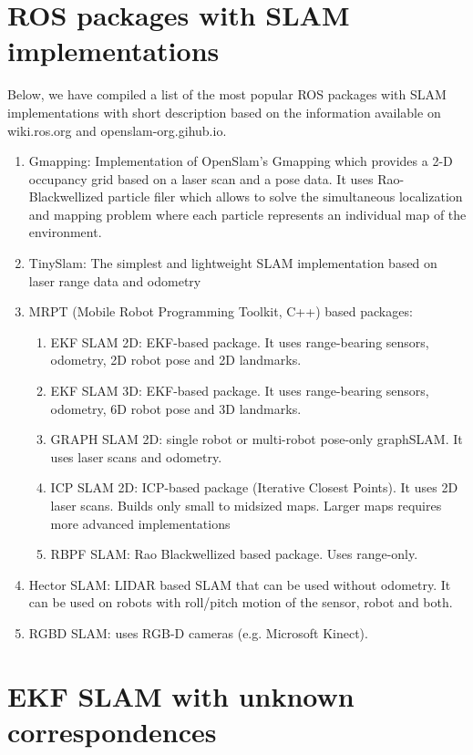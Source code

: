 \documentclass[twoside]{article}
\begin{document}
\section{ROS packages with SLAM implementations}
Below, we have compiled a list of the most popular ROS packages with SLAM implementations with short description based on the information available on wiki.ros.org and openslam-org.gihub.io.
\begin{enumerate}
    \item Gmapping: Implementation of OpenSlam's Gmapping which provides a 2-D occupancy grid based on a laser scan and a pose data. It uses Rao-Blackwellized particle filer which allows to solve the simultaneous localization and mapping problem where each particle represents an individual map of the environment.
    \item TinySlam: The simplest and lightweight SLAM implementation based on laser range data and odometry
    \item MRPT (Mobile Robot Programming Toolkit, C++) based packages:
    \begin{enumerate}
        \item EKF SLAM 2D: EKF-based package. It uses range-bearing sensors, odometry, 2D robot pose and 2D landmarks.
        \item EKF SLAM 3D: EKF-based package. It uses range-bearing sensors, odometry, 6D robot pose and 3D landmarks.
        \item GRAPH SLAM 2D: single robot or multi-robot pose-only graphSLAM. It uses laser scans and odometry.
        \item ICP SLAM 2D: ICP-based package (Iterative Closest Points). It uses 2D laser scans. Builds only small to midsized maps. Larger maps requires more advanced implementations
        \item RBPF SLAM: Rao Blackwellized based package. Uses range-only.
    \end{enumerate}
    \item Hector SLAM: LIDAR based SLAM that can be used without odometry. It can be used on robots with roll/pitch motion of the sensor, robot and both.
    \item RGBD SLAM: uses RGB-D cameras (e.g. Microsoft Kinect).
\end{enumerate}

\section {EKF SLAM with unknown correspondences}
\end{document}
